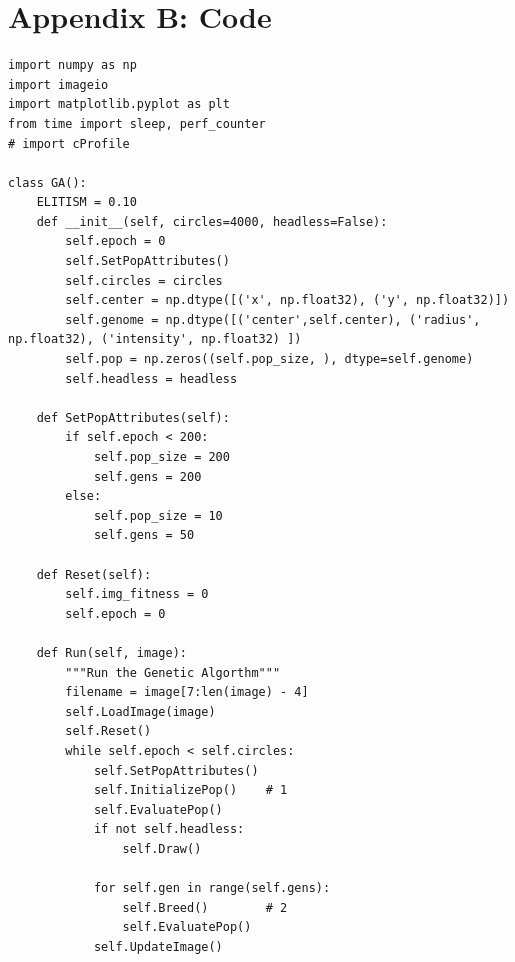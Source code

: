 \documentclass[12pt]{article}
\begin{document}
\section*{Appendix B: Code}
\begin{verbatim}
import numpy as np
import imageio
import matplotlib.pyplot as plt
from time import sleep, perf_counter
# import cProfile

class GA():
    ELITISM = 0.10
    def __init__(self, circles=4000, headless=False):
        self.epoch = 0
        self.SetPopAttributes()
        self.circles = circles
        self.center = np.dtype([('x', np.float32), ('y', np.float32)])
        self.genome = np.dtype([('center',self.center), ('radius', np.float32), ('intensity', np.float32) ])
        self.pop = np.zeros((self.pop_size, ), dtype=self.genome)
        self.headless = headless

    def SetPopAttributes(self):
        if self.epoch < 200:
            self.pop_size = 200
            self.gens = 200
        else:
            self.pop_size = 10
            self.gens = 50

    def Reset(self):
        self.img_fitness = 0
        self.epoch = 0

    def Run(self, image):
        """Run the Genetic Algorthm"""
        filename = image[7:len(image) - 4]
        self.LoadImage(image)
        self.Reset()
        while self.epoch < self.circles:
            self.SetPopAttributes()
            self.InitializePop()    # 1
            self.EvaluatePop()
            if not self.headless:
                self.Draw()

            for self.gen in range(self.gens):
                self.Breed()        # 2
                self.EvaluatePop()
            self.UpdateImage()


\end{verbatim}
\end{document}
